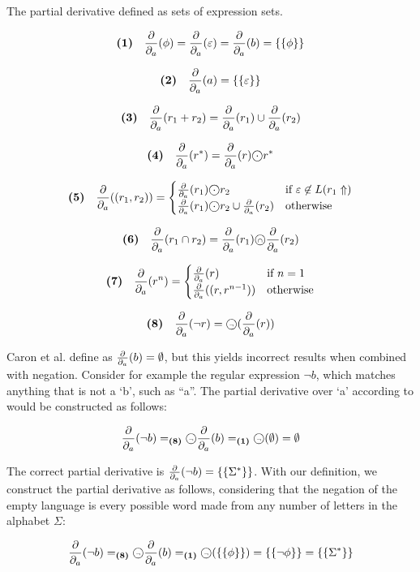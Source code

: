 \begin{defn}
   \label{defn-pd-eset}
   The partial derivative defined as sets of expression sets.

   \[\textbf{(1)}\quad \frac{\partial}{\partial_{a}}(\phi) = \frac{\partial}{\partial_{a}}(\varepsilon) = \frac{\partial}{\partial_{a}}(b) = \{\{ \phi \}\}\]

   \[\textbf{(2)}\quad \frac{\partial}{\partial_{a}}(a) = \{\{ \varepsilon \}\}\]

   \[\textbf{(3)}\quad \frac{\partial}{\partial_{a}}(r_1 + r_2) = \frac{\partial}{\partial_{a}}(r_1) \cup \frac{\partial}{\partial_{a}}(r_2)\]

   \[\nrdef{4} \dda(r^*) = \dda(r) \circledcdot r^*\]

   \[\nrdef{5} \dda((r_1, r_2)) =
       \begin{cases}
          \dda(r_1) \circledcdot r_2 & \text{if } \varepsilon \not\in L(r_1\esetsOfRe) \\
          \dda(r_1) \circledcdot r_2 \cup \dda(r_2) & \text{otherwise}
       \end{cases}
   \]

   \[\textbf{(6)}\quad \frac{\partial}{\partial_{a}}(r_1 \cap r_2) = \frac{\partial}{\partial_{a}}(r_1) \text{\textcircled{\tiny$\cap$}} \frac{\partial}{\partial_{a}}(r_2)\]

   \[\textbf{(7)}\quad \frac{\partial}{\partial_{a}}(r^n) =
       \begin{cases}
          \frac{\partial}{\partial_{a}}(r) & \text{if } n = 1 \\
          \frac{\partial}{\partial_{a}}((r, r^{n-1})) & \text{otherwise}
       \end{cases}
   \]

   \[\textbf{(8)}\quad \frac{\partial}{\partial_{a}}(\neg r) = \text{\textcircled{\tiny$\neg$}} (\frac{\partial}{\partial_{a}}(r))\]

\end{defn}

Caron et al. define  as $\frac{\partial}{\partial_{a}}(b) = \emptyset$, but this yields incorrect
results when combined with negation. Consider for example the regular expression
$\neg b$, which matches anything that is not a `b', such as ``a''.  The partial
derivative over `a' according to \cite{pdere} would be constructed as follows:

\[\frac{\partial}{\partial_{a}}(\neg b)
   =_{\textbf{(8)}} \text{\textcircled{\tiny$\neg$}} \frac{\partial}{\partial_{a}}(b)
   =_{\textbf{(1)}} \text{\textcircled{\tiny$\neg$}} (\emptyset)
   = \emptyset
\]

The correct partial derivative is $\frac{\partial}{\partial_{a}}(\neg b) = \{\{\Sigma^*\}\}$. With our
definition, we construct the partial derivative as follows, considering that the
negation of the empty language is every possible word made from any number of
letters in the alphabet $\Sigma$:

\[\frac{\partial}{\partial_{a}}(\neg b)
   =_{\textbf{(8)}} \text{\textcircled{\tiny$\neg$}} \frac{\partial}{\partial_{a}}(b)
   =_{\textbf{(1)}} \text{\textcircled{\tiny$\neg$}} (\{\{\phi\}\})
   = \{\{\neg\phi\}\}
   = \{\{\Sigma^*\}\}
\]


